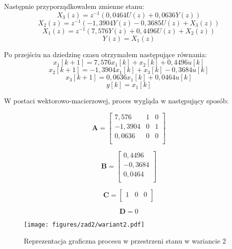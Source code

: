 \documentclass[a4paper,titlepage,11pt,floatssmall]{mwrep}
\begin{document}
Następnie przyporządkowałem zmienne stanu:
\begin{equation*}
X_3(z) = z^{-1}(0,0464U(z) + 0,0636Y(z))
\end{equation*}
\begin{equation*}
X_2(z) = z^{-1}(-1,3904Y(z) - 0,3685U(z) + X_3(z))
\end{equation*}
\begin{equation*}
X_1(z) = z^{-1}(7,576Y(z) + 0,4496U(z) + X_2(z))
\end{equation*}
\begin{equation*}
Y(z) = X_1(z)
\end{equation*}

Po przejściu na dziedzinę czasu otrzymałem następujące równania:
\begin{equation*}
x_1[k+1] = 7,576x_1[k] + x_2[k] + 0,4496u[k]
\end{equation*}
\begin{equation*}
x_2[k+1] = -1,3904x_1[k] + x_3[k] - 0,3684u[k]
\end{equation*}
\begin{equation*}
x_3[k+1] = 0,0636x_1[k] + 0,0464u[k] 
\end{equation*}
\begin{equation*}
y[k] = x_1[k]
\end{equation*}


W postaci wektorowo-macierzowej, proces wygląda w następujący sposób:

$$
\mathbf{A} =
\left[ \begin{array}{ccc}
7,576 & 1 & 0 \\
-1,3904 & 0 & 1  \\
0,0636 & 0 & 0  \\
\end{array} \right]
$$

$$
\mathbf{B} =
\left[\begin{array}{c}
0,4496 \\
-0,3684 \\
0,0464 \\
\end{array} \right]
$$

$$
\mathbf{C} =
\left[ \begin{array}{ccc}
1 & 0 & 0\\
\end{array} \right]
$$

$$
\mathbf{D} = 0
$$

\newpage

\begin{figure}[H]
\centering
\texttt{[image: figures/zad2/wariant2.pdf]}
\caption{Reprezentacja graficzna procesu w przestrzeni stanu w wariancie 2}
\end{figure}
\end{document}
